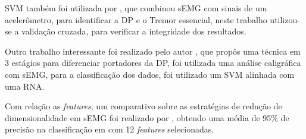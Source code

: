 SVM também foi utilizada por \cite{kugler2013automated}, que combinou sEMG com sinais de um acelerômetro, para identificar a DP e o Tremor essencial, neste trabalho utilizou-se a validação cruzada, para verificar a integridade dos resultados.

Outro trabalho interessante foi realizado pelo autor \cite{loconsole2018model}, que propôs uma técnica em 3 estágios para diferenciar portadores da DP, foi utilizada uma análise caligráfica com sEMG, para a classificação dos dados, foi utilizado um SVM alinhada com uma RNA.

Com relação as \textit{features}, um comparativo sobre as estratégias de redução de dimensionalidade em sEMG foi realizado por \cite{liu2014feature}, obtendo uma média de 95\% de precisão na classificação em com 12 \textit{features} selecionadas. 